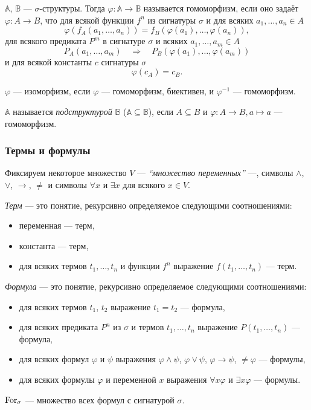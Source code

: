 \documentclass[a4paper,11pt]{article}
\begin{document}
\begin{definition}
	$\mathbb{A}$, $\mathbb{B}$ --- $\sigma$-структуры. Тогда $\varphi: \mathbb{A} \to \mathbb{B}$ называется гомоморфизм, если оно задаёт $\varphi: A \to B$, что для всякой функции $f^n$ из сигнатуры $\sigma$ и для всяких $a_1, \dots, a_n \in A$
	\[\varphi(f_A(a_1, \dots, a_n)) = f_B(\varphi(a_1), \dots, \varphi(a_n)),\]
	для всякого предиката $P^m$ в сигнатуре $\sigma$ и всяких $a_1, \dots, a_m \in A$
	\[P_A(a_1, \dots, a_m) \quad \Longrightarrow \quad P_B(\varphi(a_1), \dots, \varphi(a_m))\]
	и для всякой константы $c$ сигнатуры $\sigma$
	\[\varphi(c_A) = c_B.\]

	$\varphi$ --- изоморфизм, если $\varphi$ --- гомоморфизм, биективен, и $\varphi^{-1}$ --- гомоморфизм.

	$\mathbb{A}$ называется \emph{подструктурой} $\mathbb{B}$ ($\mathbb{A} \subseteq \mathbb{B}$), если $A \subseteq B$ и $\varphi: A \to B, a \mapsto a$ --- гомоморфизм.
\end{definition}

\subsubsection{Термы и формулы}

\begin{definition}
	Фиксируем некоторое множество $V$ --- \emph{“множество переменных”} ---, символы $\wedge$, $\vee$, $\to$, $\neq$ и символы $\forall x$ и $\exists x$ для всякого $x \in V$.
	
	\emph{Терм} --- это понятие, рекурсивно определяемое следующими соотношениями:
	\begin{itemize}
		\item переменная --- терм,
		\item константа --- терм,
		\item для всяких термов $t_1, \dots, t_n$ и функции $f^n$ выражение $f(t_1, \dots, t_n)$ --- терм.
	\end{itemize}

	\emph{Формула} --- это понятие, рекурсивно определяемое следующими соотношениями:
	\begin{itemize}
		\item для всяких термов $t_1$, $t_2$ выражение $t_1 = t_2$ --- формула,
		\item для всяких предиката $P^n$ из $\sigma$ и термов $t_1, \dots, t_n$ выражение $P(t_1, \dots, t_n)$ --- формула,
		\item для всяких формул $\varphi$ и $\psi$ выражения $\varphi \wedge \psi$, $\varphi \vee \psi$, $\varphi \to \psi$, $\neq \varphi$ --- формулы,
		\item для всяких формулы $\varphi$ и переменной $x$ выражения $\forall x \varphi$ и $\exists x \varphi$ --- формулы.
	\end{itemize}
	$\operatorname{For}_\sigma$ --- множество всех формул с сигнатурой $\sigma$.
\end{definition}
\end{document}
